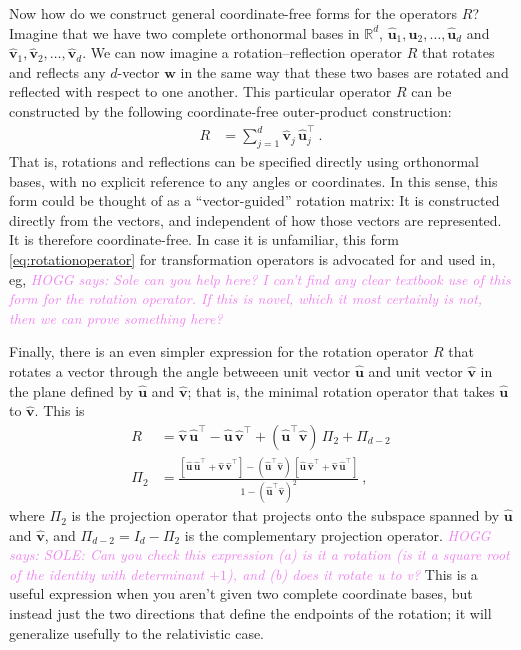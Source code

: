 \documentclass{article}
\newcommand{\proj}{\mathsf{\Pi}}
\newcommand{\Evec}[1]{{\mathbf{#1}}} %
\newcommand{\Ehat}[1]{{\mathbf{\hat{#1}}}} %
\newcommand{\HOGG}[1]{\textcolor{violet}{\textsl{HOGG says: {#1}}}}
\begin{document}
Now how do we construct general coordinate-free forms for the operators $R$?
Imagine that we have two complete orthonormal bases in $\mathbb{R}^d$, $\Ehat{u}_1,\Ehat{u}_2,\ldots,\Ehat{u}_d$ and $\Ehat{v}_1,\Ehat{v}_2,\ldots,\Ehat{v}_d$.
We can now imagine a rotation--reflection operator $R$ that rotates and reflects any $d$-vector $\Evec{w}$ in the same way that these two bases are rotated and reflected with respect to one another.
This particular operator $R$ can be constructed by the following coordinate-free outer-product construction:
\begin{align}
    R &= \sum_{j=1}^d \Ehat{v}_j\,\Ehat{u}_j^\top ~.\label{eq:rotationoperator}
\end{align}
That is, rotations and reflections can be specified directly using orthonormal bases, with no explicit reference to any angles or coordinates.
In this sense, this form could be thought of as a ``vector-guided'' rotation matrix:
It is constructed directly from the vectors, and independent of how those vectors are represented.
It is therefore coordinate-free.
In case it is unfamiliar, this form \eqref{eq:rotationoperator} for transformation operators is advocated for and used in, eg, \HOGG{Sole can you help here? I can't find any clear textbook use of this form for the rotation operator. If this is novel, which it most certainly is not, then we can prove something here?}

Finally, there is an even simpler expression for the rotation operator $R$ that rotates a vector through the angle betweeen unit vector $\Ehat{u}$ and unit vector $\Ehat{v}$ in the plane defined by $\Ehat{u}$ and $\Ehat{v}$; that is, the minimal rotation operator that takes $\Ehat{u}$ to $\Ehat{v}$.
This is
\begin{align}
    R &= \Ehat{v}\,\Ehat{u}^\top - \Ehat{u}\,\Ehat{v}^\top + (\Ehat{u}^\top\Ehat{v})\,\proj_{2} + \proj_{d-2} \label{eq:vecs2rot} \\
    \proj_2 &= \frac{[\Ehat{u}\,\Ehat{u}^\top + \Ehat{v}\,\Ehat{v}^\top] - (\Ehat{u}^\top\Ehat{v})\,[\Ehat{u}\,\Ehat{v}^\top + \Ehat{v}\,\Ehat{u}^\top]}{1 - (\Ehat{u}^\top\Ehat{v})^2} ~,
\end{align}
where $\proj_2$ is the projection operator that projects onto the subspace spanned by $\Ehat{u}$ and $\Ehat{v}$, and $\proj_{d-2} = I_d - \proj_2$ is the complementary projection operator.
\HOGG{SOLE: Can you check this expression (a) is it a rotation (is it a square root of the identity with determinant $+1$), and (b) does it rotate u to v?}
This is a useful expression when you aren't given two complete coordinate bases, but instead just the two directions that define the endpoints of the rotation; it will generalize usefully to the relativistic case.
\end{document}
